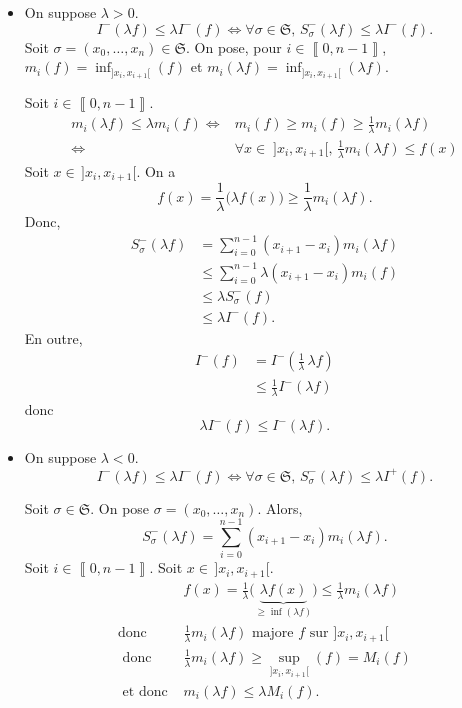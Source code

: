 \begin{prv}
	\begin{itemize}
		\item On suppose $\lambda > 0$.
			\[
				I^-(\lambda f) \le \lambda I^-(f) \iff
				\forall \sigma \in \mathfrak{S},\,S_\sigma^-(\lambda f) \le \lambda I^-(f)
			.\]
			Soit $\sigma = (x_0, \ldots, x_n) \in \mathfrak{S}$. On pose, pour $i \in \left\llbracket 0,n-1 \right\rrbracket$, $m_i(f) = \inf_{]x_i,x_{i+1}[}(f)$ et $m_i(\lambda f) = \inf_{]x_i,x_{i+1}[}(\lambda f)$.

			Soit $i \in \left\llbracket 0,n-1 \right\rrbracket$.
			\begin{align*}
				m_i(\lambda f) \le \lambda m_i(f) \iff& m_i(f) \ge m_i(f) \ge \frac{1}{\lambda}m_i(\lambda f)\\
				\iff& \forall x \in\;]x_i,x_{i+1}[,\,\frac{1}{\lambda} m_i(\lambda f) \le f(x)
			\end{align*}
			Soit $x \in \,]x_i,x_{i+1}[$. On a \[
				f(x) = \frac{1}{\lambda}\big(\lambda f(x)\big) \ge \frac{1}{\lambda}m_i(\lambda f)
			.\] Donc,
			\begin{align*}
				S^-_{\sigma}(\lambda f) &= \sum_{i=0}^{n-1}(x_{i+1}-x_i) m_i(\lambda f) \\
				&\le \sum_{i=0}^{n-1}\lambda(x_{i+1}-x_i)m_i(f)\\
				&\le \lambda S^-_\sigma(f)\\
				&\le \lambda I^-(f).
			\end{align*}
			En outre,
			\begin{align*}
				I^-(f) &= I^- \left( \frac{1}{\lambda}\,\lambda f \right) \\
				&\le \frac{1}{\lambda}I^-(\lambda f)
			\end{align*}
			donc \[
				\lambda I^-(f) \le I^-(\lambda f)
			.\]
		\item On suppose $\lambda < 0$.
			\[
				I^-(\lambda f) \le \lambda I^-(f) \iff
				\forall \sigma \in \mathfrak{S},\,S^-_\sigma(\lambda f) \le \lambda I^+(f)
			.\]

			Soit $\sigma \in \mathfrak{S}$. On pose $\sigma = (x_0, \ldots, x_n)$. Alors, \[
				S^-_{\sigma}(\lambda f) = \sum_{i=0}^{n-1}(x_{i+1}-x_i) m_i(\lambda f)
			.\] Soit $i \in \left\llbracket 0,n-1 \right\rrbracket$. Soit $x \in \,]x_i,x_{i+1}[$.
%
			\begin{align*}
				~&f(x) = \frac{1}{\lambda}\big(\underbrace{\lambda f(x)}_{\ge \inf(\lambda f)}\big) \le \frac{1}{\lambda} m_i(\lambda f)\\
				\text{donc }& \frac{1}{\lambda}m_i(\lambda f) \text{ majore } f \text{ sur } ]x_i,x_{i+1}[\\
				\text{ donc }& \frac{1}{\lambda}m_i(\lambda f) \ge \sup_{]x_i,x_{i+1}[}(f) = M_i(f)\\
				\text{ et donc }& m_i(\lambda f) \le \lambda M_i(f).
			\end{align*}


\end{itemize}
\end{prv}
